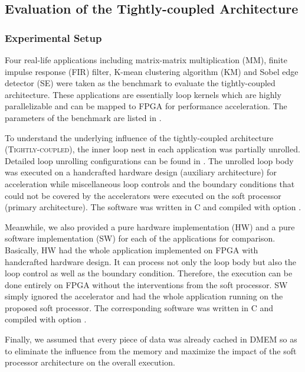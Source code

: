 \subsection{Evaluation of the Tightly-coupled Architecture}
\subsubsection{Experimental Setup}
Four real-life applications including matrix-matrix multiplication (MM), finite impulse response (FIR) filter, K-mean clustering algorithm (KM) and Sobel edge detector (SE) were taken as the benchmark to evaluate the tightly-coupled architecture. These applications are essentially loop kernels which are highly parallelizable and can be mapped to FPGA for performance acceleration. The parameters of the benchmark are listed in .

To understand the underlying influence of the tightly-coupled architecture (\textsc{Tightly-coupled}), the inner loop nest in each application was partially unrolled. Detailed loop unrolling configurations can be found in . The unrolled loop body was executed on a handcrafted hardware design (auxiliary architecture) for acceleration while miscellaneous loop controls and the boundary conditions that could not be covered by the accelerators were executed on the soft processor (primary architecture). The software was written in C and compiled with option . 

Meanwhile, we also provided a pure hardware implementation (\textsc{HW}) and a pure software implementation (\textsc{SW}) for each of the applications for comparison. Basically, \textsc{HW} had the whole application implemented on FPGA with handcrafted hardware design. It can process not only the loop body but also the loop control as well as the boundary condition. Therefore, the execution can be done entirely on FPGA without the interventions from the soft processor. \textsc{SW} simply ignored the accelerator and had the whole application running on the proposed soft processor. The corresponding software was written in C and compiled with option . 

Finally, we assumed that every piece of data was already cached in DMEM so as to eliminate the influence from the memory and maximize the impact of the soft processor architecture on the overall execution.


